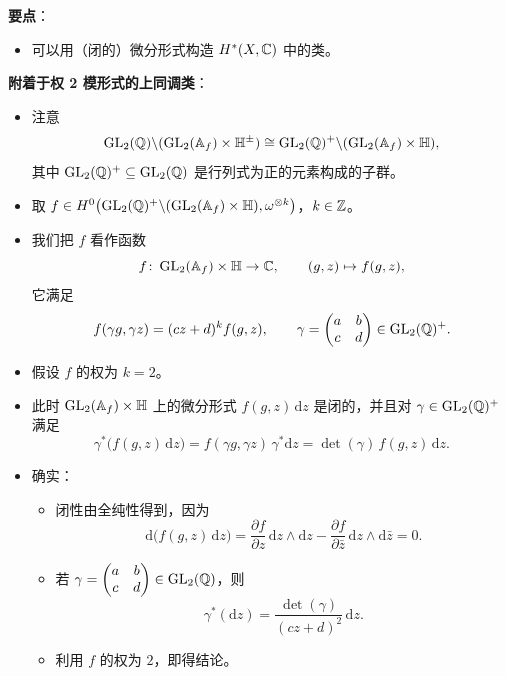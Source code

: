 \noindent\textbf{要点}：
\begin{itemize}
\item 可以用（闭的）微分形式构造 $H^*(X,\mathbb{C})$ 中的类。
\end{itemize}

\noindent\textbf{附着于权 2 模形式的上同调类}：
\begin{itemize}
\item 注意
\[
\operatorname{GL}_2(\mathbb{Q})\backslash(\operatorname{GL}_2(\mathbb{A}_f)\times\mathbb{H}^\pm)\cong\operatorname{GL}_2(\mathbb{Q})^+\backslash(\operatorname{GL}_2(\mathbb{A}_f)\times\mathbb{H}),
\]
其中 $\operatorname{GL}_2(\mathbb{Q})^+\subseteq\operatorname{GL}_2(\mathbb{Q})$ 是行列式为正的元素构成的子群。
\item 取 $f\in H^0\bigl(\operatorname{GL}_2(\mathbb{Q})^+\backslash(\operatorname{GL}_2(\mathbb{A}_f)\times\mathbb{H}),\omega^{\otimes k}\bigr)$，$k\in\mathbb{Z}$。
\item 我们把 $f$ 看作函数
\[
f\colon\operatorname{GL}_2(\mathbb{A}_f)\times\mathbb{H}\to\mathbb{C},\qquad (g,z)\mapsto f(g,z),
\]
它满足
\[
f(\gamma g,\gamma z)=(cz+d)^kf(g,z),\qquad \gamma=\begin{pmatrix}a&b\\c&d\end{pmatrix}\in\operatorname{GL}_2(\mathbb{Q})^+ .
\]
\item 假设 $f$ 的权为 $k=2$。
\item 此时 $\operatorname{GL}_2(\mathbb{A}_f)\times\mathbb{H}$ 上的微分形式 $f(g,z)\,\mathrm{d}z$ 是闭的，并且对 $\gamma\in\operatorname{GL}_2(\mathbb{Q})^+$ 满足
\[
\gamma^*\bigl(f(g,z)\,\mathrm{d}z\bigr)=f(\gamma g,\gamma z)\,\gamma^*\mathrm{d}z=\det(\gamma)\,f(g,z)\,\mathrm{d}z .
\]
\item 确实：
\begin{itemize}
\item 闭性由全纯性得到，因为
\[
\mathrm{d}\bigl(f(g,z)\,\mathrm{d}z\bigr)=\frac{\partial f}{\partial z}\,\mathrm{d}z\wedge\mathrm{d}z-\frac{\partial f}{\partial\bar z}\,\mathrm{d}z\wedge\mathrm{d}\bar z=0 .
\]
\item 若 $\gamma=\begin{pmatrix}a&b\\c&d\end{pmatrix}\in\operatorname{GL}_2(\mathbb{Q})$，则
\[
\gamma^*(\mathrm{d}z)=\frac{\det(\gamma)}{(cz+d)^2}\,\mathrm{d}z .
\]
\item 利用 $f$ 的权为 $2$，即得结论。
\end{itemize}


\end{itemize}
